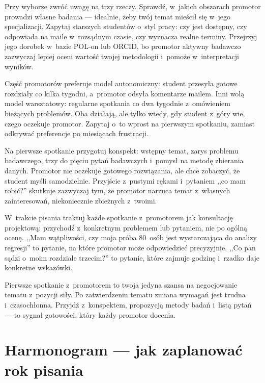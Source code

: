 \documentclass[11pt,a5paper,twoside,openany]{book}
\let\bforigsection\section
\renewcommand{\section}{\needspace{4\baselineskip}\bforigsection}
\begin{document}
Przy wyborze zwróć uwagę na trzy rzeczy. Sprawdź, w~jakich obszarach promotor prowadzi własne badania --- idealnie, żeby twój temat mieścił się w~jego specjalizacji. Zapytaj starszych studentów o~styl pracy: czy jest dostępny, czy odpowiada na maile w~rozsądnym czasie, czy wyznacza realne terminy. Przejrzyj jego dorobek w~bazie POL-on lub ORCID, bo promotor aktywny badawczo zazwyczaj lepiej oceni wartość twojej metodologii i~pomoże w~interpretacji wyników.

\begin{examplebox}
Część promotorów preferuje model autonomiczny: student przesyła gotowe rozdziały co kilka tygodni, a~promotor odsyła komentarze mailem. Inni wolą model warsztatowy: regularne spotkania co dwa tygodnie z~omówieniem bieżących problemów. Oba działają, ale tylko wtedy, gdy student z~góry wie, czego oczekuje promotor. Zapytaj o~to wprost na pierwszym spotkaniu, zamiast odkrywać preferencje po miesiącach frustracji.
\end{examplebox}

Na pierwsze spotkanie przygotuj konspekt: wstępny temat, zarys problemu badawczego, trzy do pięciu pytań badawczych i~pomysł na metodę zbierania danych. Promotor nie oczekuje gotowego rozwiązania, ale chce zobaczyć, że student myśli samodzielnie. Przyjście z~pustymi rękami i~pytaniem ,,co mam robić?'' skutkuje zazwyczaj tym, że promotor narzuca temat z~własnych zainteresowań, niekoniecznie zbieżnych z~twoimi.

W~trakcie pisania traktuj każde spotkanie z~promotorem jak konsultację projektową: przychodź z~konkretnym problemem lub pytaniem, nie po ogólną ocenę. ,,Mam wątpliwości, czy moja próba 80~osób jest wystarczająca do analizy regresji'' to pytanie, na które promotor może odpowiedzieć precyzyjnie. ,,Co pan sądzi o~moim rozdziale trzecim?'' to pytanie, które zajmuje godzinę i~rzadko daje konkretne wskazówki.

\begin{keyinsight}
Pierwsze spotkanie z~promotorem to twoja jedyna szansa na negocjowanie tematu z~pozycji siły. Po zatwierdzeniu tematu zmiana wymagań jest trudna i~czasochłonna. Przyjdź z~konspektem, propozycją metody badań i~listą pytań --- to sygnał gotowości, który każdy promotor docenia.
\end{keyinsight}

\section{Harmonogram --- jak zaplanować rok pisania}
\end{document}
